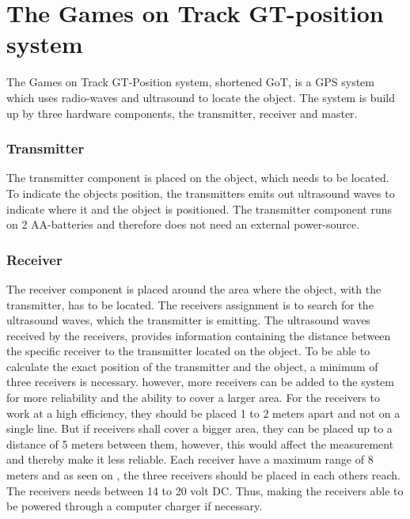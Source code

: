 \section{The Games on Track GT-position system}
The Games on Track GT-Position system, shortened GoT, is a GPS system which uses radio-waves and ultrasound to locate the object. The system is build up by three hardware components, the transmitter, receiver and master. 

\subsubsection{Transmitter}
The transmitter component is placed on the object, which needs to be located. To indicate the objects position, the transmitters emits out ultrasound waves to indicate where it and the object is positioned. The transmitter component runs on 2 AA-batteries and therefore does not need an external power-source. 

\subsubsection{Receiver}
The receiver component is placed around the area where the object, with the transmitter, has to be located. The receivers assignment is to search for the ultrasound waves, which the transmitter is emitting. The ultrasound waves received by the receivers, provides information containing the distance between the specific receiver to the transmitter located on the object. To be able to calculate the exact position of the transmitter and the object, a minimum of three receivers is necessary. however, more receivers can be added to the system for more reliability and the ability to cover a larger area. For the receivers to work at a high efficiency, they should be placed 1 to 2 meters apart and not on a single line. But if receivers shall cover a bigger area, they can be placed up to a distance of 5 meters between them, however, this would affect the measurement and thereby make it less reliable. Each receiver have a maximum range of 8 meters and as seen on , the three receivers should be placed in each others reach. The receivers needs between 14 to 20 volt DC. Thus, making the receivers able to be powered through a computer charger if necessary.

